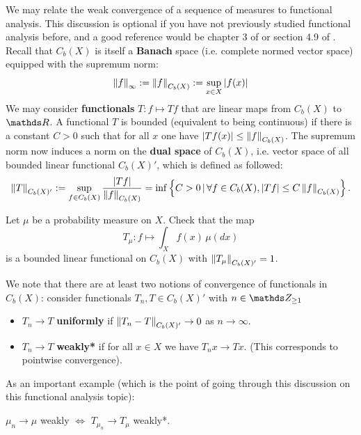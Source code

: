 \begin{unexaminable}
We may relate the weak convergence of a sequence of measures to functional analysis. This discussion is optional if you have not previously studied functional analysis before, and a good reference would be chapter 3 of \cite{BrezisFuncAnalysis} or section 4.9 of \cite{KreyszigFuncAnalysis}. Recall that $C_b(X)$ is itself a \textbf{Banach} space (i.e. complete normed vector space) equipped with the supremum norm:
\begin{equation}
    \left\| f \right\|_\infty := \left\| f \right\|_{C_b(X)} := \sup_{x \in X} |f(x)|
\end{equation}
We may consider \textbf{functionals} $T: f \mapsto Tf$ that are linear maps from $C_b(X)$ to $\R$. A functional $T$ is bounded (equivalent to being continuous) if there is a constant $C > 0$ such that for all $x$ one have $|Tf(x)| \leq \left\| f \right\|_{C_b(X)}$. The supremum norm now induces a norm on the \textbf{dual space} of $C_b(X)$, i.e. vector space of all bounded linear functional $C_b(X)'$, which is defined as followed:
\begin{equation}
    \left\| T \right\|_{C_b(X)'} := \sup_{f \in C_b(X)} \frac{|Tf|}{\left\| f \right\|_{C_b(X)}} = \inf \left\{ C>0 \,|\, \forall f \in C_b(X), |Tf| \leq C\left\| f \right\|_{C_b(X)} \right \}.
\end{equation}

\begin{exercise}
Let $\mu$ be a probability measure on $X$. Check that the map 
\begin{equation*}
    T_\mu: f \mapsto \int_X f(x) \, \mu(dx)
\end{equation*}
is a bounded linear functional on $C_b(X)$ with $\left\| T_\mu \right\|_{C_b(X)'} = 1$.
\end{exercise}

We note that there are at least two notions of convergence of functionals in $C_b(X)$: consider functionals $T_n, T \in C_b(X)'$ with $n \in \Z_{\geq 1}$
\begin{itemize}
    \item $T_n \to T$ \textbf{uniformly} if $\left\| T_n - T \right\|_{C_b(X)'} \to 0$ as $n \to \infty$.
    \item $T_n \to T$ \textbf{weakly*} if for all $x \in X$ we have $T_n x \to Tx$. (This corresponds to pointwise convergence).
\end{itemize}

As an important example (which is the point of going through this discussion on this functional analysis topic):
\begin{example}
$\mu_n \to \mu$ weakly $\iff$ $T_{\mu_n} \to T_\mu$ weakly*.
\end{example}


\end{unexaminable}
